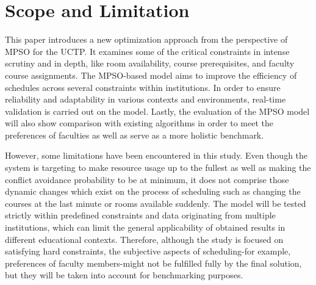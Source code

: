 \section{Scope and Limitation}
\label{sec:scopeandlimitation}

This paper introduces a new optimization approach from the perspective of MPSO for the UCTP. It examines some of the critical constraints in intense scrutiny and in depth, like room availability, course prerequisites, and faculty course assignments. The MPSO-based model aims to improve the efficiency of schedules across several constraints within institutions. In order to ensure reliability and adaptability in various contexts and environments, real-time validation is carried out on the model. Lastly, the evaluation of the MPSO model will also show comparison with existing algorithms in order to meet the preferences of faculties as well as serve as a more holistic benchmark.

However, some limitations have been encountered in this study. Even though the system is targeting to make resource usage up to the fullest as well as making the conflict avoidance probability to be at minimum, it does not comprise those dynamic changes which exist on the process of scheduling such as changing the courses at the last minute or rooms available suddenly. The model will be tested strictly within predefined constraints and data originating from multiple institutions, which can limit the general applicability of obtained results in different educational contexts. Therefore, although the study is focused on satisfying hard constraints, the subjective aspects of scheduling-for example, preferences of faculty members-might not be fulfilled fully by the final solution, but they will be taken into account for benchmarking purposes.
